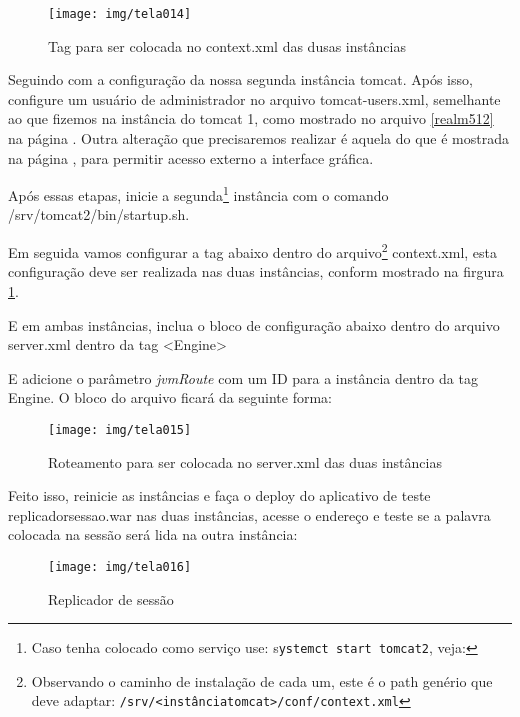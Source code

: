 \begin{figure}[p]
	\centering
	\caption[context.xml]{Tag para ser colocada no context.xml das dusas instâncias}
	\texttt{[image: img/tela014]}
	\label{fig:tomcat-ii-contextxml}
\end{figure}

\newpage
Seguindo com a configuração da nossa segunda instância tomcat. Após isso, configure um usuário de administrador no arquivo tomcat-users.xml, semelhante ao que fizemos na instância do tomcat 1, como mostrado no arquivo \ref{realm512} na página \pageref{realm512}. Outra alteração que precisaremos realizar é aquela do  que é mostrada na página \pageref{contextxml}, para permitir acesso externo a interface gráfica.

Após essas etapas, inicie a segunda\footnote{Caso tenha colocado como serviço use: s\texttt{ystemct start tomcat2}, veja: \texttt{}} instância com o comando /srv/tomcat2/bin/startup.sh.

Em seguida vamos configurar a tag abaixo dentro do arquivo\footnote{Observando o caminho de instalação de cada um, este é o path genério que deve adaptar: \newline\hspace*{.65cm}\texttt{{\footnotesize /srv/<instânciatomcat>/conf/context.xml}}} context.xml, esta configuração deve ser realizada nas duas instâncias, conform mostrado na firgura \ref{fig:tomcat-ii-contextxml}.

E em ambas instâncias, inclua o bloco de configuração abaixo dentro do arquivo server.xml dentro da tag <Engine>


\newpage
E adicione o parâmetro \emph{jvmRoute} com um ID para a instância dentro da tag Engine. O bloco do arquivo ficará da seguinte forma:

\begin{figure}[H]
	\centering
	\caption[server.xml]{Roteamento para ser colocada no server.xml das duas instâncias}
	\texttt{[image: img/tela015]}
	\label{fig:tomcat-ii-route}
\end{figure}
Feito isso, reinicie as instâncias e faça o deploy do aplicativo de teste replicadorsessao.war nas duas instâncias, acesse o endereço e teste se a palavra colocada na sessão será lida na outra instância:
\begin{figure}[H]
	\centering
	\caption[replicadorsessao.war]{Replicador de sessão}
	\texttt{[image: img/tela016]}
	\label{fig:tomcat-ii-replic}
\end{figure}

